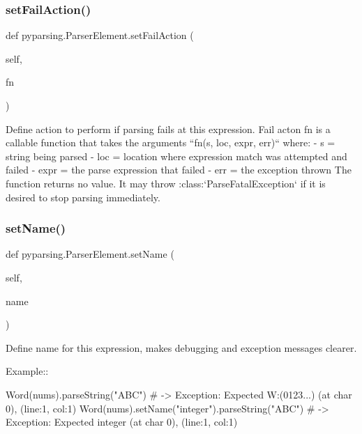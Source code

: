 \subsubsection{\texorpdfstring{set\+Fail\+Action()}{setFailAction()}}
{\footnotesize\ttfamily def pyparsing.\+Parser\+Element.\+set\+Fail\+Action (\begin{DoxyParamCaption}\item[{}]{self,  }\item[{}]{fn }\end{DoxyParamCaption})}

\begin{DoxyVerb}Define action to perform if parsing fails at this expression.
   Fail acton fn is a callable function that takes the arguments
   ``fn(s, loc, expr, err)`` where:
   - s = string being parsed
   - loc = location where expression match was attempted and failed
   - expr = the parse expression that failed
   - err = the exception thrown
   The function returns no value.  It may throw :class:`ParseFatalException`
   if it is desired to stop parsing immediately.\end{DoxyVerb}
 \mbox{\label{classpyparsing_1_1ParserElement_a8197a4fff4f269747bb21028452a3755}} 
\subsubsection{\texorpdfstring{set\+Name()}{setName()}}
{\footnotesize\ttfamily def pyparsing.\+Parser\+Element.\+set\+Name (\begin{DoxyParamCaption}\item[{}]{self,  }\item[{}]{name }\end{DoxyParamCaption})}

\begin{DoxyVerb}Define name for this expression, makes debugging and exception messages clearer.

Example::

    Word(nums).parseString("ABC")  # -> Exception: Expected W:(0123...) (at char 0), (line:1, col:1)
    Word(nums).setName("integer").parseString("ABC")  # -> Exception: Expected integer (at char 0), (line:1, col:1)
\end{DoxyVerb}
 \mbox{\label{classpyparsing_1_1ParserElement_ad19e8d671046a66846d01f0604618f97}} 
